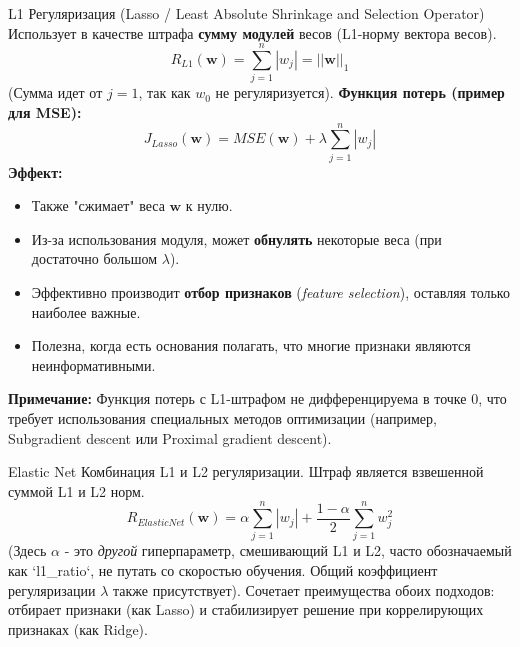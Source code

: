 \begin{myblock}{L1 Регуляризация (Lasso / Least Absolute Shrinkage and Selection Operator)}
    Использует в качестве штрафа \textbf{сумму модулей} весов (L1-норму вектора весов).
    \[ R_{L1}(\mathbf{w}) = \sum_{j=1}^{n} |w_j| = ||\mathbf{w}||_1 \]
    (Сумма идет от $j=1$, так как $w_0$ не регуляризуется).
    \textbf{Функция потерь (пример для MSE):}
    \[ J_{Lasso}(\mathbf{w}) = MSE(\mathbf{w}) + \lambda \sum_{j=1}^{n} |w_j| \]
    \textbf{Эффект:}
    \begin{itemize}[nosep, leftmargin=*]
        \item Также "сжимает" веса $\mathbf{w}$ к нулю.
        \item Из-за использования модуля, может \textbf{обнулять} некоторые веса (при достаточно большом $\lambda$).
        \item Эффективно производит \textbf{отбор признаков} (\textit{feature selection}), оставляя только наиболее важные.
        \item Полезна, когда есть основания полагать, что многие признаки являются неинформативными.
    \end{itemize}
    \textbf{Примечание:} Функция потерь с L1-штрафом не дифференцируема в точке 0, что требует использования специальных методов оптимизации (например, Subgradient descent или Proximal gradient descent).
\end{myblock}

\begin{myexampleblock}{Elastic Net}
    Комбинация L1 и L2 регуляризации. Штраф является взвешенной суммой L1 и L2 норм.
    \[ R_{ElasticNet}(\mathbf{w}) = \alpha \sum_{j=1}^{n} |w_j| + \frac{1-\alpha}{2} \sum_{j=1}^{n} w_j^2 \]
    (Здесь $\alpha$ - это \textit{другой} гиперпараметр, смешивающий L1 и L2, часто обозначаемый как `l1\_ratio`, не путать со скоростью обучения. Общий коэффициент регуляризации $\lambda$ также присутствует).
    Сочетает преимущества обоих подходов: отбирает признаки (как Lasso) и стабилизирует решение при коррелирующих признаках (как Ridge).
\end{myexampleblock}

